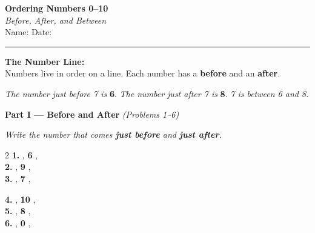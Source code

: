 \documentclass[12pt, letterpaper]{article}
\newcommand{\answerline}{\underline{\hspace{2.5cm}}}
\newcommand{\biganswerline}{\underline{\hspace{4cm}}}
\newcommand{\numbox}{\fbox{\hspace{0.6cm}\vphantom{0}}}
\begin{document}
\begin{center}
  {\LARGE\textbf{\textcolor{scholared}{Ordering Numbers 0–10}}}\\[4pt]
  {\Large\textcolor{scholagold}{\textit{Before, After, and Between}}}\\[6pt]
  {\small Name: \biganswerline \hspace{1cm} Date: \answerline}
\end{center}

\vspace{4pt}
\noindent\textcolor{scholared}{\rule{\linewidth}{1pt}}
\vspace{4pt}


\begin{lessonbox}
\textbf{The Number Line:}\\[4pt]
Numbers live in order on a line. Each number has a \textbf{before} and an \textbf{after}.\\[6pt]
\begin{center}
\end{center}
\medskip
\noindent\textit{The number just before 7 is} \textbf{6}. \quad
\textit{The number just after 7 is} \textbf{8}. \quad
\textit{7 is between 6 and 8.}
\end{lessonbox}

\bigskip

\noindent\textcolor{scholared}{\large\textbf{Part I — Before and After}} \hfill \textit{(Problems 1–6)}

\medskip
\noindent\textit{Write the number that comes \textbf{just before} and \textbf{just after}.}

\bigskip

\begin{multicols}{2}
\noindent\textbf{1.} \quad \numbox \; , \; \textbf{6} \; , \; \numbox \\[16pt]
\noindent\textbf{2.} \quad \numbox \; , \; \textbf{9} \; , \; \numbox \\[16pt]
\noindent\textbf{3.} \quad \numbox \; , \; \textbf{7} \; , \; \numbox

\columnbreak

\noindent\textbf{4.} \quad \numbox \; , \; \textbf{10} \; , \; \numbox \\[16pt]
\noindent\textbf{5.} \quad \numbox \; , \; \textbf{8} \; , \; \numbox \\[16pt]
\noindent\textbf{6.} \quad \numbox \; , \; \textbf{0} \; , \; \numbox
\end{multicols}
\end{document}
